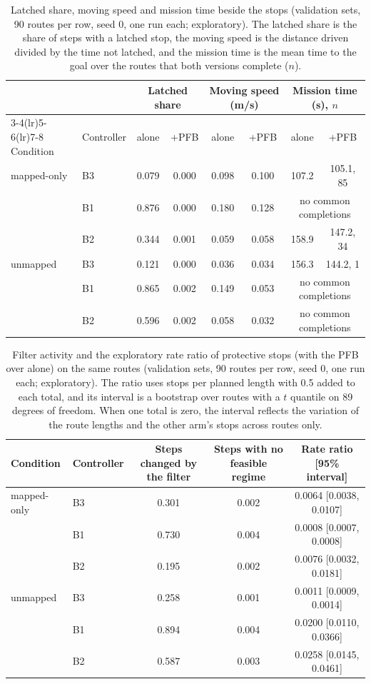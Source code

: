\begin{table}[t]
\caption{Latched share, moving speed and mission time beside the stops (validation sets, 90 routes per row, seed 0, one run each; exploratory). The latched share is the share of steps with a latched stop, the moving speed is the distance driven divided by the time not latched, and the mission time is the mean time to the goal over the routes that both versions complete ($n$).}
\label{tab:classical-time}
\centering
\small
\setlength{\tabcolsep}{4pt}
\begin{tabular}{llcccccc}
\toprule
 & & \multicolumn{2}{c}{Latched share} & \multicolumn{2}{c}{Moving speed (m/s)} & \multicolumn{2}{c}{Mission time (s), $n$} \\
\cmidrule(lr){3-4}\cmidrule(lr){5-6}\cmidrule(lr){7-8}
Condition & Controller & alone & +PFB & alone & +PFB & alone & +PFB \\
\midrule
mapped-only & B3 & 0.079 & 0.000 & 0.098 & 0.100 & 107.2 & 105.1, 85 \\
 & B1 & 0.876 & 0.000 & 0.180 & 0.128 & \multicolumn{2}{c}{no common completions} \\
 & B2 & 0.344 & 0.001 & 0.059 & 0.058 & 158.9 & 147.2, 34 \\
\midrule
unmapped & B3 & 0.121 & 0.000 & 0.036 & 0.034 & 156.3 & 144.2, 1 \\
 & B1 & 0.865 & 0.002 & 0.149 & 0.053 & \multicolumn{2}{c}{no common completions} \\
 & B2 & 0.596 & 0.002 & 0.058 & 0.032 & \multicolumn{2}{c}{no common completions} \\
\bottomrule
\end{tabular}
\end{table}

\begin{table}[t]
\caption{Filter activity and the exploratory rate ratio of protective stops (with the PFB over alone) on the same routes (validation sets, 90 routes per row, seed 0, one run each; exploratory). The ratio uses stops per planned length with 0.5 added to each total, and its interval is a bootstrap over routes with a $t$ quantile on 89 degrees of freedom. When one total is zero, the interval reflects the variation of the route lengths and the other arm's stops across routes only.}
\label{tab:classical-ratio}
\centering
\small
\setlength{\tabcolsep}{4pt}
\begin{tabular}{llccc}
\toprule
Condition & Controller & Steps changed by the filter & Steps with no feasible regime & Rate ratio [95\% interval] \\
\midrule
mapped-only & B3 & 0.301 & 0.002 & 0.0064 [0.0038, 0.0107] \\
 & B1 & 0.730 & 0.004 & 0.0008 [0.0007, 0.0008] \\
 & B2 & 0.195 & 0.002 & 0.0076 [0.0032, 0.0181] \\
\midrule
unmapped & B3 & 0.258 & 0.001 & 0.0011 [0.0009, 0.0014] \\
 & B1 & 0.894 & 0.004 & 0.0200 [0.0110, 0.0366] \\
 & B2 & 0.587 & 0.003 & 0.0258 [0.0145, 0.0461] \\
\bottomrule
\end{tabular}
\end{table}

